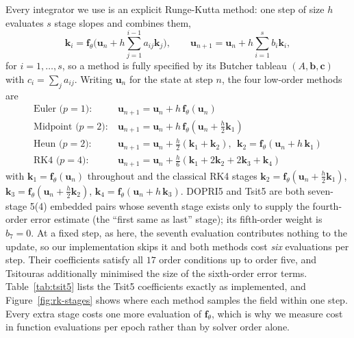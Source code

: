 Every integrator we use is an explicit Runge-Kutta method: one step of size
$h$ evaluates $s$ stage slopes and combines them,
\begin{equation}
\mathbf{k}_i=\mathbf{f}_\theta\Big(\mathbf{u}_n+h\sum_{j=1}^{i-1}a_{ij}\mathbf{k}_j\Big),
\qquad
\mathbf{u}_{n+1}=\mathbf{u}_n+h\sum_{i=1}^{s}b_i\mathbf{k}_i,
\label{eq:rk-general}
\end{equation}
for $i=1,\dots,s$, so a method is fully specified by its Butcher tableau
$(A,\mathbf{b},\mathbf{c})$ with $c_i=\sum_j a_{ij}$. Writing
$\mathbf{u}_n$ for the state at step $n$, the four low-order methods are
\begin{align}
\text{Euler ($p=1$):}\ & \mathbf{u}_{n+1} = \mathbf{u}_n + h\, \mathbf{f}_\theta(\mathbf{u}_n) \label{eq:euler}\\
\text{Midpoint ($p=2$):}\ & \mathbf{u}_{n+1} = \mathbf{u}_n + h\,\mathbf{f}_\theta\!\left(\mathbf{u}_n + \tfrac{h}{2}\mathbf{k}_1\right) \label{eq:midpoint}\\
\text{Heun ($p=2$):}\ & \mathbf{u}_{n+1} = \mathbf{u}_n + \tfrac{h}{2}(\mathbf{k}_1+\mathbf{k}_2),\ \ \mathbf{k}_2 = \mathbf{f}_\theta(\mathbf{u}_n+h\,\mathbf{k}_1) \label{eq:heun}\\
\text{RK4 ($p=4$):}\ & \mathbf{u}_{n+1} = \mathbf{u}_n + \tfrac{h}{6}\left(\mathbf{k}_1+2\mathbf{k}_2+2\mathbf{k}_3+\mathbf{k}_4\right) \label{eq:rk4}
\end{align}
with $\mathbf{k}_1=\mathbf{f}_\theta(\mathbf{u}_n)$ throughout and the
classical RK4 stages
$\mathbf{k}_2=\mathbf{f}_\theta(\mathbf{u}_n+\tfrac{h}{2}\mathbf{k}_1)$,
$\mathbf{k}_3=\mathbf{f}_\theta(\mathbf{u}_n+\tfrac{h}{2}\mathbf{k}_2)$,
$\mathbf{k}_4=\mathbf{f}_\theta(\mathbf{u}_n+h\,\mathbf{k}_3)$. DOPRI5 and
Tsit5 are both seven-stage 5(4) embedded pairs whose seventh stage exists
only to supply the fourth-order error estimate (the ``first same as last''
stage); its fifth-order weight is $b_7=0$. At a fixed step, as here, the
seventh evaluation contributes nothing to the update, so our implementation
skips it and both methods cost \emph{six} evaluations per step. Their
coefficients satisfy all $17$ order conditions up to order five, and
Tsitouras \cite{tsitouras2011tsit5} additionally minimised the size of the
sixth-order error terms. Table~\ref{tab:tsit5} lists the Tsit5 coefficients
exactly as implemented, and Figure~\ref{fig:rk-stages} shows where each
method samples the field within one step. Every extra stage costs one more
evaluation of $\mathbf{f}_\theta$, which is why we measure cost in function
evaluations per epoch rather than by solver order alone.

